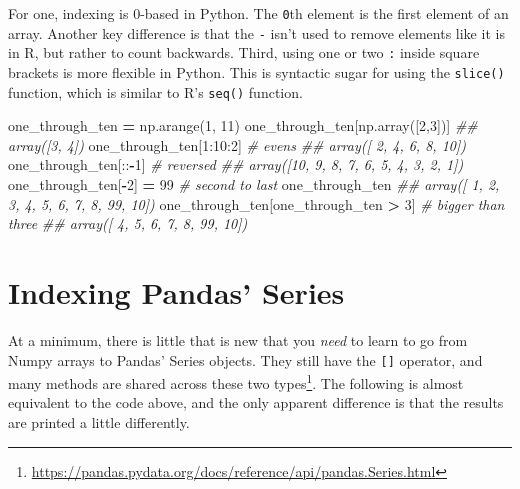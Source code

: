 \documentclass[12pt,krantz2]{krantz}
\makeatletter
\newenvironment{Shaded}{\begin{snugshade}}{\end{snugshade}}
\newcommand{\CommentTok}[1]{\textcolor[rgb]{0.37,0.37,0.37}{\textit{#1}}}
\newcommand{\DecValTok}[1]{\textcolor[rgb]{0.06,0.06,0.06}{#1}}
\newcommand{\NormalTok}[1]{#1}
\newcommand{\OperatorTok}[1]{\textcolor[rgb]{0.43,0.43,0.43}{\textbf{#1}}}
\renewcommand{\href}[2]{#2\footnote{\url{#1}}}
\newenvironment{kframe}{%
\medskip{}
\setlength{\fboxsep}{.8em}
 \def\at@end@of@kframe{}%
 \ifinner\ifhmode%
  \def\at@end@of@kframe{\end{minipage}}%
  \begin{minipage}{\columnwidth}%
 \fi\fi%
 \def\FrameCommand##1{\hskip\@totalleftmargin \hskip-\fboxsep
 \colorbox{shadecolor}{##1}\hskip-\fboxsep
     \hskip-\linewidth \hskip-\@totalleftmargin \hskip\columnwidth}%
 \MakeFramed {\advance\hsize-\width
   \@totalleftmargin\z@ \linewidth\hsize
   \@setminipage}}%
 {\par\unskip\endMakeFramed%
 \at@end@of@kframe}
\renewenvironment{Shaded}{\begin{kframe}}{\end{kframe}}
\makeatother
\begin{document}
For one, indexing is 0-based in Python. The \texttt{0}th element is the first element of an array. Another key difference is that the \texttt{-} isn't used to remove elements like it is in R, but rather to count backwards. Third, using one or two \texttt{:} inside square brackets is more flexible in Python. This is syntactic sugar for using the \texttt{slice()} function, which is similar to R's \texttt{seq()} function.

\begin{Shaded}
\begin{Highlighting}[]
\NormalTok{one_through_ten }\OperatorTok{=}\NormalTok{ np.arange(}\DecValTok{1}\NormalTok{, }\DecValTok{11}\NormalTok{)}
\NormalTok{one_through_ten[np.array([}\DecValTok{2}\NormalTok{,}\DecValTok{3}\NormalTok{])]}
\CommentTok{## array([3, 4])}
\NormalTok{one_through_ten[}\DecValTok{1}\NormalTok{:}\DecValTok{10}\NormalTok{:}\DecValTok{2}\NormalTok{] }\CommentTok{# evens}
\CommentTok{## array([ 2,  4,  6,  8, 10])}
\NormalTok{one_through_ten[::}\OperatorTok{-}\DecValTok{1}\NormalTok{] }\CommentTok{# reversed}
\CommentTok{## array([10,  9,  8,  7,  6,  5,  4,  3,  2,  1])}
\NormalTok{one_through_ten[}\OperatorTok{-}\DecValTok{2}\NormalTok{] }\OperatorTok{=} \DecValTok{99} \CommentTok{# second to last}
\NormalTok{one_through_ten}
\CommentTok{## array([ 1,  2,  3,  4,  5,  6,  7,  8, 99, 10])}
\NormalTok{one_through_ten[one_through_ten }\OperatorTok{>} \DecValTok{3}\NormalTok{] }\CommentTok{# bigger than three}
\CommentTok{## array([ 4,  5,  6,  7,  8, 99, 10])}
\end{Highlighting}
\end{Shaded}

\hypertarget{indexing-pandas-series}{%
\section{Indexing Pandas' Series}\label{indexing-pandas-series}}

At a minimum, there is little that is new that you \emph{need} to learn to go from Numpy arrays to Pandas' Series objects. They still have the \texttt{{[}{]}} operator, and \href{https://pandas.pydata.org/docs/reference/api/pandas.Series.html}{many methods are shared across these two types}. The following is almost equivalent to the code above, and the only apparent difference is that the results are printed a little differently.
\end{document}
